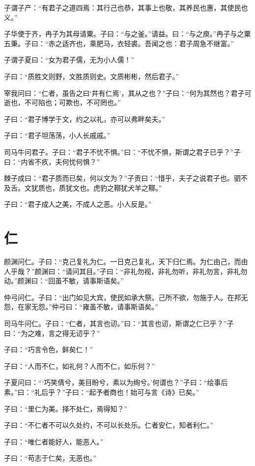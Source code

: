\documentclass[a5paper]{ctexbook}
\begin{document}
    子谓子产：“有君子之道四焉：其行己也恭，其事上也敬，其养民也惠，其使民也义。”

    子华使于齐，冉子为其母请粟。子曰：“与之釜。”请益。曰：“与之庾。”冉子与之粟五秉。子曰：“赤之适齐也，乘肥马，衣轻裘。吾闻之也：君子周急不继富。”

    子谓子夏曰：“女为君子儒，无为小人儒！”

    子曰：“质胜文则野，文胜质则史。文质彬彬，然后君子。”

    宰我问曰：“仁者，虽告之曰‘井有仁焉’，其从之也？”子曰：“何为其然也？君子可逝也，不可陷也；可欺也，不可罔也。”

    子曰：“君子博学于文，约之以礼，亦可以弗畔矣夫。”

    子曰：“君子坦荡荡，小人长戚戚。”

    司马牛问君子。子曰：“君子不忧不惧。”曰：“不忧不惧，斯谓之君子已乎？”子曰：“内省不疚，夫何忧何惧？”

    棘子成曰：“君子质而已矣，何以文为？”子贡曰：“惜乎，夫子之说君子也。驷不及舌。文犹质也，质犹文也。虎豹之鞹犹犬羊之鞹。”

    子曰：“君子成人之美，不成人之恶。小人反是。”

    \chapter{仁}

    颜渊问仁。子曰：“克己复礼为仁。一日克己复礼，天下归仁焉。为仁由己，而由人乎哉？”颜渊曰：“请问其目。”子曰：“非礼勿视，非礼勿听，非礼勿言，非礼勿动。”颜渊曰：“回虽不敏，请事斯语矣。”

    仲弓问仁。子曰：“出门如见大宾，使民如承大祭。己所不欲，勿施于人。在邦无怨，在家无怨。”仲弓曰：“雍虽不敏，请事斯语矣。”

    司马牛问仁。子曰：“仁者，其言也讱。”曰：“其言也讱，斯谓之仁已乎？”子曰：“为之难，言之得无讱乎？”

    子曰：“巧言令色，鲜矣仁！”

    子曰：“人而不仁，如礼何？人而不仁，如乐何？”

    子夏问曰：“‘巧笑倩兮，美目盼兮，素以为绚兮。’何谓也？”子曰：“绘事后素。”曰：“礼后乎？”子曰：“起予者商也！始可与言《诗》已矣。”

    子曰：“里仁为美。择不处仁，焉得知？”

    子曰：“不仁者不可以久处约，不可以长处乐。仁者安仁，知者利仁。”

    子曰：“唯仁者能好人，能恶人。”

    子曰：“苟志于仁矣，无恶也。”
\end{document}
